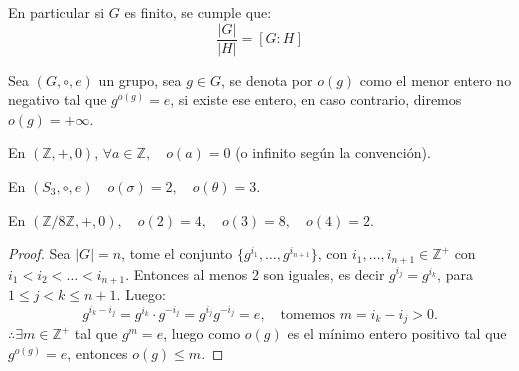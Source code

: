 En particular si $G$ es finito, se cumple que:
\begin{equation*}
	\frac{|G|}{|H|} = [G:H]
\end{equation*}

\begin{defi}
	Sea $(G, \circ, e)$ un grupo, sea $g \in G$, se denota por $o(g)$ como el menor entero no negativo tal que $g^{o(g)} = e$, si existe ese entero, en caso contrario, diremos $o(g) = +\infty$.
\end{defi}

\begin{eje}
	En $(\mathbb{Z}, +, 0)$, $\forall a \in \mathbb{Z}, \quad o(a) = 0$ (o infinito según la convención).
\end{eje}

\begin{eje}
	En $(S_3, \circ, e) \quad o(\sigma) = 2, \quad o(\theta) = 3$.
\end{eje}

\begin{eje}
	En $(\mathbb{Z}/8\mathbb{Z}, +, 0), \quad o(2)=4, \quad o(3)=8, \quad o(4)=2$.
\end{eje}


\begin{proof}
	Sea $|G|=n$, tome el conjunto $\{g^{i_1}, \dots, g^{i_{n+1}}\}$, con $i_1, \dots, i_{n+1} \in \mathbb{Z}^+$ con $i_1 < i_2 < \dots < i_{n+1}$. Entonces al menos 2 son iguales, es decir $g^{i_j} = g^{i_k}$, para $1 \le j < k \le n+1$.
	Luego:
	\begin{equation*}
		g^{i_k - i_j} = g^{i_k} \cdot g^{-i_j} = g^{i_j} g^{-i_j} = e, \quad \text{tomemos } m = i_k - i_j > 0.
	\end{equation*}
	$\therefore \exists m \in \mathbb{Z}^+$ tal que $g^m = e$, luego como $o(g)$ es el mínimo entero positivo tal que $g^{o(g)} = e$, entonces $o(g) \le m$.
\end{proof}


